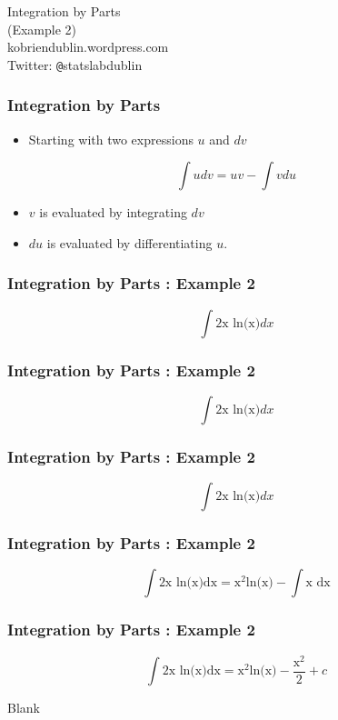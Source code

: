 \documentclass{beamer}
\begin{document}
\begin{frame}
\begin{center}
\Huge
Integration by Parts\\
\LARGE
(Example 2)\\
\bigskip
kobriendublin.wordpress.com\\
Twitter: \texttt{@}statslabdublin


\end{center}
\end{frame}

\begin{frame}
\frametitle{Integration by Parts}
\LARGE
\begin{itemize}
\item Starting with two expressions $u$ and $dv$
\end{itemize}

\[\int u dv = uv - \int vdu \]
\begin{itemize}
\item $v$ is evaluated by integrating $dv$
\item $du$ is evaluated by differentiating $u$.
\end{itemize}
\end{frame}


\begin{frame}
\frametitle{Integration by Parts :  Example 2}
\Huge
\vspace{-3cm}
\[\int \mbox{2x ln(x)} dx\]

 
\end{frame}
\begin{frame}
\frametitle{Integration by Parts :  Example 2}
\Huge
\vspace{-3cm}
\[\int \mbox{2x ln(x)} dx\]

 

\end{frame}
\begin{frame}
\frametitle{Integration by Parts :  Example 2}
\Huge
\vspace{-3cm}
\[\int \mbox{2x ln(x)} dx\]

 

\end{frame}
\begin{frame}
\frametitle{Integration by Parts :  Example 2}
\Huge
\vspace{-3cm}
\[\int \mbox{2x ln(x)dx}  = \mbox{x}^2\mbox{ln(x)} - \int \mbox{x dx} \]

 
\end{frame}
\begin{frame}
\frametitle{Integration by Parts :  Example 2}
\Huge
\vspace{-3cm}
\[\int \mbox{2x ln(x)dx} = \mbox{x}^2\mbox{ln(x)} - \frac{\mbox{x}^2}{2} + c \]

 
\end{frame}
\begin{frame}
Blank
\end{frame}
\end{document}
